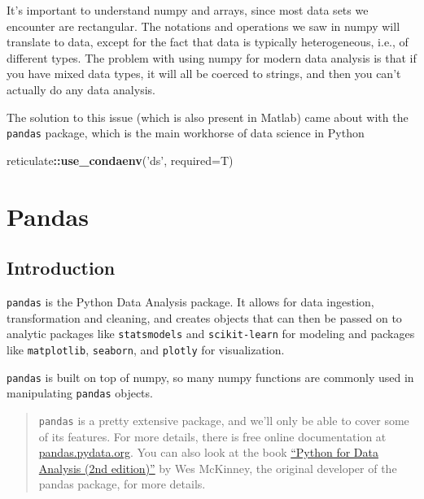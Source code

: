 \documentclass[
  letterpaper,
]{scrbook}
\newenvironment{Shaded}{\begin{snugshade}}{\end{snugshade}}
\newcommand{\DataTypeTok}[1]{\textcolor[rgb]{0.13,0.29,0.53}{#1}}
\newcommand{\KeywordTok}[1]{\textcolor[rgb]{0.13,0.29,0.53}{\textbf{#1}}}
\newcommand{\NormalTok}[1]{#1}
\newcommand{\OperatorTok}[1]{\textcolor[rgb]{0.81,0.36,0.00}{\textbf{#1}}}
\newcommand{\StringTok}[1]{\textcolor[rgb]{0.31,0.60,0.02}{#1}}
\begin{document}
It's important to understand numpy and arrays, since most data sets we encounter are rectangular. The notations and operations we saw in numpy will translate to data, except for the fact that data is typically heterogeneous, i.e., of different types. The problem with using numpy for modern data analysis is that if you have mixed data types, it will all be coerced to strings, and then you can't actually do any data analysis.

The solution to this issue (which is also present in Matlab) came about with the \texttt{pandas} package, which is the main workhorse of data science in Python

\begin{Shaded}
\begin{Highlighting}[]
\NormalTok{reticulate}\OperatorTok{::}\KeywordTok{use_condaenv}\NormalTok{(}\StringTok{'ds'}\NormalTok{, }\DataTypeTok{required=}\NormalTok{T)}
\end{Highlighting}
\end{Shaded}

\hypertarget{pandas}{%
\chapter{Pandas}\label{pandas}}

\hypertarget{introduction-1}{%
\section{Introduction}\label{introduction-1}}

\texttt{pandas} is the Python Data Analysis package. It allows for data ingestion, transformation and cleaning, and creates objects that can then be passed on to analytic packages like \texttt{statsmodels} and \texttt{scikit-learn} for modeling and packages like \texttt{matplotlib}, \texttt{seaborn}, and \texttt{plotly} for visualization.

\texttt{pandas} is built on top of numpy, so many numpy functions are commonly used in manipulating \texttt{pandas} objects.

\begin{quote}
\texttt{pandas} is a pretty extensive package, and we'll only be able to cover some of its features. For more details, there is free online documentation at \href{https://pandas.pydata.org}{pandas.pydata.org}. You can also look at the book \href{https://www.amazon.com/Python-Data-Analysis-Wrangling-IPython-dp-1491957662/dp/1491957662/}{``Python for Data Analysis (2nd edition)''} by Wes McKinney, the original developer of the pandas package, for more details.
\end{quote}
\end{document}
